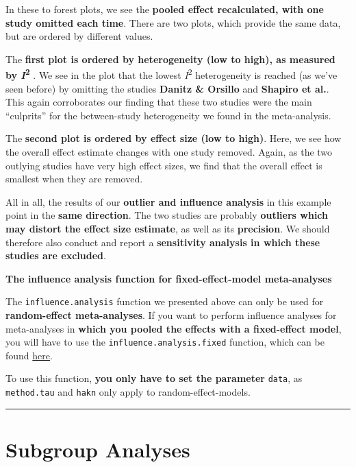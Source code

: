 \documentclass[]{book}
\theoremstyle{definition}
\theoremstyle{definition}
\theoremstyle{definition}
\theoremstyle{remark}
\begin{document}
In these to forest plots, we see the \textbf{pooled effect recalculated,
with one study omitted each time}. There are two plots, which provide
the same data, but are ordered by different values.

The \textbf{first plot is ordered by heterogeneity (low to high), as
measured by \emph{I}\textsuperscript{2} }. We see in the plot that the
lowest \emph{I}\textsuperscript{2} heterogeneity is reached (as we've
seen before) by omitting the studies \textbf{Danitz \& Orsillo} and
\textbf{Shapiro et al.}. This again corroborates our finding that these
two studies were the main ``culprits'' for the between-study
heterogeneity we found in the meta-analysis.

The \textbf{second plot is ordered by effect size (low to high)}. Here,
we see how the overall effect estimate changes with one study removed.
Again, as the two outlying studies have very high effect sizes, we find
that the overall effect is smallest when they are removed.

All in all, the results of our \textbf{outlier and influence analysis}
in this example point in the \textbf{same direction}. The two studies
are probably \textbf{outliers which may distort the effect size
estimate}, as well as its \textbf{precision}. We should therefore also
conduct and report a \textbf{sensitivity analysis in which these studies
are excluded}.

\begin{rmdachtung}
\textbf{The influence analysis function for fixed-effect-model
meta-analyses}

The \texttt{influence.analysis} function we presented above can only be
used for \textbf{random-effect meta-analyses}. If you want to perform
influence analyses for meta-analyses in \textbf{which you pooled the
effects with a fixed-effect model}, you will have to use the
\texttt{influence.analysis.fixed} function, which can be found
\href{https://github.com/MathiasHarrer/Doing-Meta-Analysis-in-R/blob/master/influence_analysis_function_for_fixed_effect_model.R}{here}.

To use this function, \textbf{you only have to set the parameter}
\texttt{data}, as \texttt{method.tau} and \texttt{hakn} only apply to
random-effect-models.
\end{rmdachtung}

\begin{center}\rule{0.5\linewidth}{\linethickness}\end{center}

\chapter{Subgroup Analyses}\label{subgroup}
\end{document}

